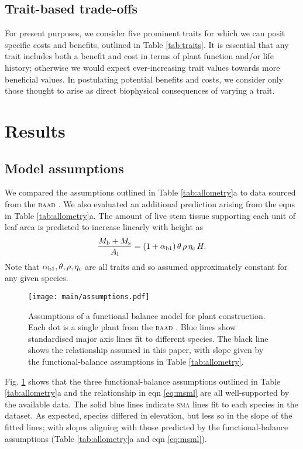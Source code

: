 \documentclass[9pt,twocolumn,twoside]{pnas-new}
\newcommand{\sma}{\textsc{sma}}
\begin{document}
\subsection{Trait-based trade-offs}

For present purposes, we consider five prominent traits for which we can posit specific costs and benefits, outlined in Table \ref{tab:traits}. It is essential that any trait includes both a benefit and cost in terms of plant function and/or life history; otherwise we would expect ever-increasing trait values towards more beneficial values. In postulating potential benefits and costs, we consider only those thought to arise as direct biophysical consequences of varying a trait.

\section*{Results}

\subsection{Model assumptions}

We compared the assumptions outlined in Table \ref{tab:allometry}a to data sourced from the \textsc{baad} \citep{Falster-2015b}. We also evaluated an additional prediction arising from the eqns in Table \ref{tab:allometry}a. The amount of live stem tissue supporting each unit of leaf area is predicted to increase linearly with height as
\begin{equation}\label{eq:msml}
\frac{M_{\rm b} + M_{\rm s}}{A_{\rm l}} = (1+ \alpha_{\rm b1}) \,\theta \, \rho \, \eta_c \, H.
\end{equation}
Note that $\alpha_{\rm b1}, \theta, \rho, \eta_c$ are all traits and so assumed approximately constant for any given species.


\begin{figure}[!hb]
\centering
\texttt{[image: main/assumptions.pdf]}
\caption{Assumptions of a functional balance model for plant construction.
Each dot is a single plant from the \textsc{baad} \citep{Falster-2015b}.
Blue lines show standardised major axis lines fit to different species. The black line shows the relationship assumed in this paper, with slope given by the functional-balance assumptions in Table \ref{tab:allometry}.
}
\label{fig:assumptions}
\end{figure}


Fig. \ref{fig:assumptions} shows that the three functional-balance assumptions outlined in Table \ref{tab:allometry}a and the relationship in eqn \ref{eq:msml} are all well-supported by the available data. The solid blue lines indicate {\sma} lines fit to each species in the dataset. As expected, species differed in elevation, but less so in the slope of the fitted lines; with slopes aligning with those predicted by the functional-balance assumptions (Table \ref{tab:allometry}a and eqn \ref{eq:msml}).
\end{document}
